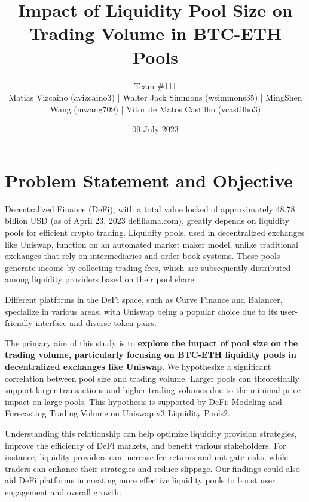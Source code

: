 \documentclass{article}
\makeatletter
\renewcommand{\maketitle}{\bgroup\setlength{\parindent}{0pt}
\begin{center} %
  \Large\@title
  \newline
  \footnotesize\@author
\end{center}
\begin{flushright}
  \@date
\end{flushright}
\egroup}
\makeatother
\begin{document}
\title{Impact of Liquidity Pool Size on Trading Volume in BTC-ETH Pools}
\author{
  Team \#111 \\
   \scriptsize Matias Vizcaino (avizcaino3) | Walter Jack Simmons (wsimmons35) | MingShen Wang (mwang709) | Vítor de Matos Castilho (vcastilho3)
}
\date{09 July 2023}
\maketitle



\noindent
{\setlength{\tabcolsep}{4pt} %

\section*{\textbf{Problem Statement and Objective}}

Decentralized Finance (DeFi), with a total value locked of approximately 48.78 billion USD (as of April 23, 2023 defillama.com), greatly depends on liquidity pools for efficient crypto trading. Liquidity pools, used in decentralized exchanges like Uniswap, function on an automated market maker model, unlike traditional exchanges that rely on intermediaries and order book systems. These pools generate income by collecting trading fees, which are subsequently distributed among liquidity providers based on their pool share.

Different platforms in the DeFi space, such as Curve Finance and Balancer, specialize in various areas, with Uniswap being a popular choice due to its user-friendly interface and diverse token pairs. 

The primary aim of this study is to \textbf{explore the impact of pool size on the trading volume, particularly focusing on BTC-ETH liquidity pools in decentralized exchanges like Uniswap}. We hypothesize a significant correlation between pool size and trading volume. Larger pools can theoretically support larger transactions and higher trading volumes due to the minimal price impact on large pools. This hypothesis is supported by DeFi: Modeling and Forecasting Trading Volume on Uniswap v3 Liquidity Pools2. 

Understanding this relationship can help optimize liquidity provision strategies, improve the efficiency of DeFi markets, and benefit various stakeholders. For instance, liquidity providers can increase fee returns and mitigate risks, while traders can enhance their strategies and reduce slippage. Our findings could also aid DeFi platforms in creating more effective liquidity pools to boost user engagement and overall growth.

}
\end{document}
